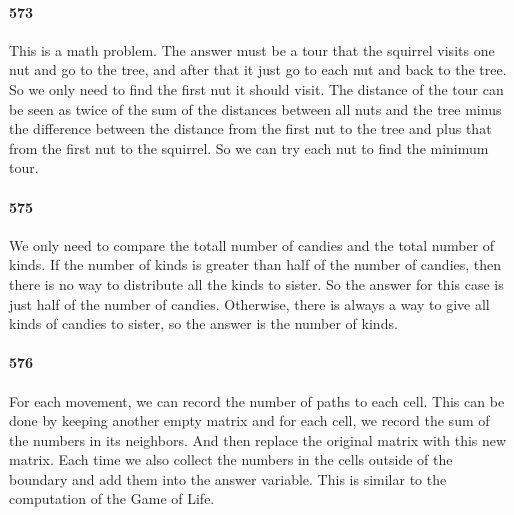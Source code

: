 \documentclass[11pt]{article}
\begin{document}
\paragraph{573}
This is a math problem. The answer must be a tour that the squirrel visits one nut and go to the tree, and after that it just 
go to each nut and back to the tree. So we only need to find the first nut it should visit. The distance of the tour can be 
seen as twice of the sum of the distances between all nuts and the tree minus the difference between the distance from the first nut to the tree and plus that from the first nut to the squirrel. So we can try each nut to find the minimum tour.



\paragraph{575}
We only need to compare the totall number of candies and the total number of kinds. If the number of kinds is greater than 
half of the number of candies, then there is no way to distribute all the kinds to sister. So the answer for this case is 
just half of the number of candies. Otherwise, there is always a way to give all kinds of candies to sister, so the answer is
the number of kinds.

\paragraph{576}
For each movement, we can record the number of paths to each cell. This can be done by keeping another empty matrix and 
for each cell, we record the sum of the numbers in its neighbors. And then replace the original matrix with this new matrix.
Each time we also collect the numbers in the cells outside of the 
boundary and add them into the answer variable. This is similar to the computation of the Game of Life.
\end{document}

